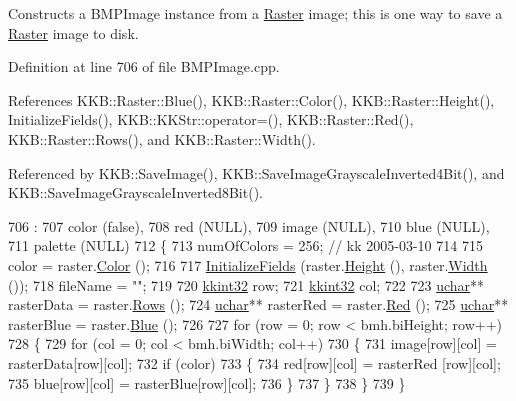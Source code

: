 Constructs a B\+M\+P\+Image instance from a \hyperlink{class_k_k_b_1_1_raster}{Raster} image; this is one way to save a \hyperlink{class_k_k_b_1_1_raster}{Raster} image to disk. 



Definition at line 706 of file B\+M\+P\+Image.\+cpp.



References K\+K\+B\+::\+Raster\+::\+Blue(), K\+K\+B\+::\+Raster\+::\+Color(), K\+K\+B\+::\+Raster\+::\+Height(), Initialize\+Fields(), K\+K\+B\+::\+K\+K\+Str\+::operator=(), K\+K\+B\+::\+Raster\+::\+Red(), K\+K\+B\+::\+Raster\+::\+Rows(), and K\+K\+B\+::\+Raster\+::\+Width().



Referenced by K\+K\+B\+::\+Save\+Image(), K\+K\+B\+::\+Save\+Image\+Grayscale\+Inverted4\+Bit(), and K\+K\+B\+::\+Save\+Image\+Grayscale\+Inverted8\+Bit().


\begin{DoxyCode}
706                                         :
707   color   (\textcolor{keyword}{false}),
708   red     (NULL),
709   image   (NULL),
710   blue    (NULL),
711   palette (NULL)
712 \{
713   numOfColors = 256;  \textcolor{comment}{// kk 2005-03-10}
714 
715   color = raster.\hyperlink{class_k_k_b_1_1_raster_a644248f99009d64ac4b8fef4a22aff25}{Color} ();
716 
717   \hyperlink{class_k_k_b_1_1_bmp_image_ac00d5d64ef0ed8db88445ccea0e94048}{InitializeFields} (raster.\hyperlink{class_k_k_b_1_1_raster_af8d10d15697d5b92fb9595c48b529feb}{Height} (), raster.\hyperlink{class_k_k_b_1_1_raster_aa2780c0b7ae75b7b595f99329689c1f6}{Width} ());
718   fileName = \textcolor{stringliteral}{""};
719 
720   \hyperlink{namespace_k_k_b_a8fa4952cc84fda1de4bec1fbdd8d5b1b}{kkint32}  row;
721   \hyperlink{namespace_k_k_b_a8fa4952cc84fda1de4bec1fbdd8d5b1b}{kkint32}  col;
722 
723   \hyperlink{namespace_k_k_b_ace9969169bf514f9ee6185186949cdf7}{uchar}** rasterData = raster.\hyperlink{class_k_k_b_1_1_raster_a2460989f656e5222d6074cd0ba85ed72}{Rows} ();
724   \hyperlink{namespace_k_k_b_ace9969169bf514f9ee6185186949cdf7}{uchar}** rasterRed  = raster.\hyperlink{class_k_k_b_1_1_raster_a337a5a064b27693eec6e380789680239}{Red} ();
725   \hyperlink{namespace_k_k_b_ace9969169bf514f9ee6185186949cdf7}{uchar}** rasterBlue = raster.\hyperlink{class_k_k_b_1_1_raster_ae289ec3ad3a27339cd30e9ac3b488004}{Blue} ();
726 
727   \textcolor{keywordflow}{for}  (row = 0; row < bmh.biHeight; row++)
728   \{
729     \textcolor{keywordflow}{for}  (col = 0; col < bmh.biWidth; col++)
730     \{
731       image[row][col] = rasterData[row][col];
732       \textcolor{keywordflow}{if}  (color)
733       \{
734         red[row][col]  = rasterRed [row][col];
735         blue[row][col] = rasterBlue[row][col];
736       \}
737     \}
738   \}
739 \}
\end{DoxyCode}
